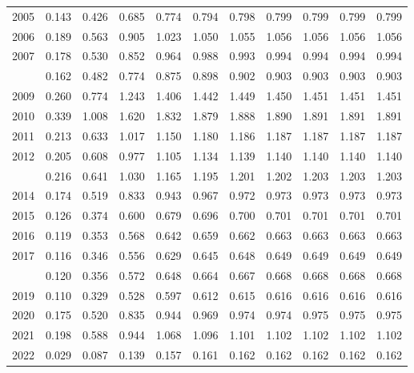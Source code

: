 \documentclass[
]{article}
\begin{document}
\begin{longtable}[t]{lrrrrrrrrrr}
2005 & 0.143 & 0.426 & 0.685 & 0.774 & 0.794 & 0.798 & 0.799 & 0.799 & 0.799 & 0.799\\
2006 & 0.189 & 0.563 & 0.905 & 1.023 & 1.050 & 1.055 & 1.056 & 1.056 & 1.056 & 1.056\\
2007 & 0.178 & 0.530 & 0.852 & 0.964 & 0.988 & 0.993 & 0.994 & 0.994 & 0.994 & 0.994\\
\addlinespace
2008 & 0.162 & 0.482 & 0.774 & 0.875 & 0.898 & 0.902 & 0.903 & 0.903 & 0.903 & 0.903\\
2009 & 0.260 & 0.774 & 1.243 & 1.406 & 1.442 & 1.449 & 1.450 & 1.451 & 1.451 & 1.451\\
2010 & 0.339 & 1.008 & 1.620 & 1.832 & 1.879 & 1.888 & 1.890 & 1.891 & 1.891 & 1.891\\
2011 & 0.213 & 0.633 & 1.017 & 1.150 & 1.180 & 1.186 & 1.187 & 1.187 & 1.187 & 1.187\\
2012 & 0.205 & 0.608 & 0.977 & 1.105 & 1.134 & 1.139 & 1.140 & 1.140 & 1.140 & 1.140\\
\addlinespace
2013 & 0.216 & 0.641 & 1.030 & 1.165 & 1.195 & 1.201 & 1.202 & 1.203 & 1.203 & 1.203\\
2014 & 0.174 & 0.519 & 0.833 & 0.943 & 0.967 & 0.972 & 0.973 & 0.973 & 0.973 & 0.973\\
2015 & 0.126 & 0.374 & 0.600 & 0.679 & 0.696 & 0.700 & 0.701 & 0.701 & 0.701 & 0.701\\
2016 & 0.119 & 0.353 & 0.568 & 0.642 & 0.659 & 0.662 & 0.663 & 0.663 & 0.663 & 0.663\\
2017 & 0.116 & 0.346 & 0.556 & 0.629 & 0.645 & 0.648 & 0.649 & 0.649 & 0.649 & 0.649\\
\addlinespace
2018 & 0.120 & 0.356 & 0.572 & 0.648 & 0.664 & 0.667 & 0.668 & 0.668 & 0.668 & 0.668\\
2019 & 0.110 & 0.329 & 0.528 & 0.597 & 0.612 & 0.615 & 0.616 & 0.616 & 0.616 & 0.616\\
2020 & 0.175 & 0.520 & 0.835 & 0.944 & 0.969 & 0.974 & 0.974 & 0.975 & 0.975 & 0.975\\
2021 & 0.198 & 0.588 & 0.944 & 1.068 & 1.096 & 1.101 & 1.102 & 1.102 & 1.102 & 1.102\\
2022 & 0.029 & 0.087 & 0.139 & 0.157 & 0.161 & 0.162 & 0.162 & 0.162 & 0.162 & 0.162\\*
\end{longtable}
\end{document}
